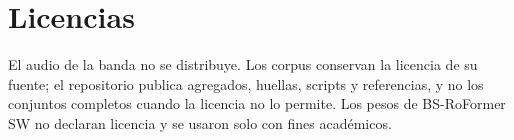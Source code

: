 \section{Licencias}

El audio de la banda no se distribuye. Los corpus conservan la licencia de su fuente; el repositorio publica agregados,
huellas, scripts y referencias, y no los conjuntos completos cuando la licencia no lo permite. Los pesos de BS-RoFormer
SW no declaran licencia y se usaron solo con fines académicos.
